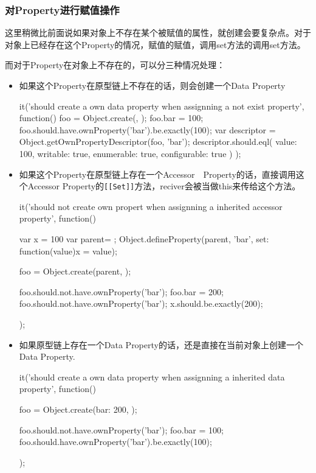 \subsubsection{对Property进行赋值操作}
这里稍微比前面说如果对象上不存在某个被赋值的属性，就创建会要复杂点。对于对象上已经存在这个Property的情况，赋值的赋值，调用set方法的调用set方法。

而对于Property在对象上不存在的，可以分三种情况处理：
\begin{itemize}
\item 如果这个Property在原型链上不存在的话，则会创建一个Data Property
\begin{JavaScript}[Property在原型链上也不存在的话]
		it('should create a own data property when assignning a not exist property', function() {
			foo = Object.create({}, {});
			foo.bar = 100;
			foo.should.have.ownProperty('bar').be.exactly(100);
			var descriptor = Object.getOwnPropertyDescriptor(foo, 'bar');
			descriptor.should.eql({
				value: 100,
				writable: true,
				enumerable: true,
				configurable: true
			})
		});
\end{JavaScript}
\item 如果这个Property在原型链上存在一个Accessor　Property的话，直接调用这个Accessor Property的\lstinline![[Set]]!方法，reciver会被当做this来传给这个方法。
\begin{JavaScript}
		it('should not create own propert when assignning a inherited accessor property', function(){
			var x = 100
			var parent= {};
			Object.defineProperty(parent, 'bar', {set: function(value){x = value}});

			foo = Object.create(parent, {});

			foo.should.not.have.ownProperty('bar');
			foo.bar = 200;
			foo.should.not.have.ownProperty('bar');
			x.should.be.exactly(200);
		});
\end{JavaScript}

\item 如果原型链上存在一个Data Property的话，还是直接在当前对象上创建一个Data Property.
\begin{JavaScript}
		it('should create a own data property when assignning a inherited data property', function(){
			foo = Object.create({bar: 200}, {});

			foo.should.not.have.ownProperty('bar');
			foo.bar = 100;
			foo.should.have.ownProperty('bar').be.exactly(100);
		});
\end{JavaScript}
\end{itemize}
	

